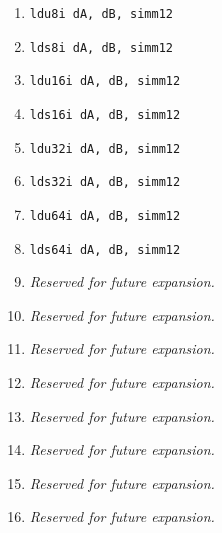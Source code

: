 \documentclass{article}
\begin{document}
\begin{itemize}
\begin{enumerate}
			\item \texttt{ldu8i dA, dB, simm12}
			\item \texttt{lds8i dA, dB, simm12}
			\item \texttt{ldu16i dA, dB, simm12}
			\item \texttt{lds16i dA, dB, simm12}

			\item \texttt{ldu32i dA, dB, simm12}
			\item \texttt{lds32i dA, dB, simm12}
			\item \texttt{ldu64i dA, dB, simm12}
			\item \texttt{lds64i dA, dB, simm12}

			\item \textit{Reserved for future expansion.}
			\item \textit{Reserved for future expansion.}
			\item \textit{Reserved for future expansion.}
			\item \textit{Reserved for future expansion.}

			\item \textit{Reserved for future expansion.}
			\item \textit{Reserved for future expansion.}
			\item \textit{Reserved for future expansion.}
			\item \textit{Reserved for future expansion.}
			\end{enumerate}
		\end{itemize}
		\newpage
\end{document}
